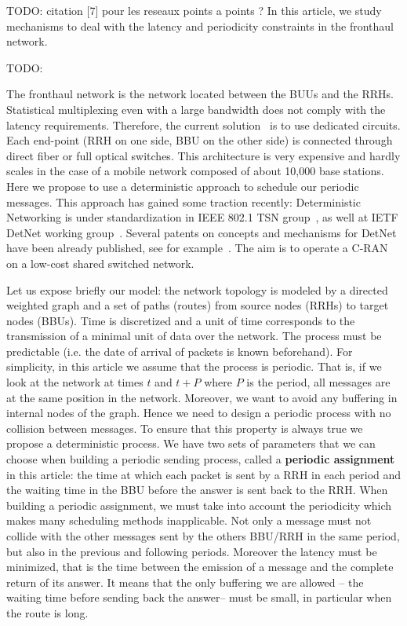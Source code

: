 \documentclass[a4paper,10pt]{article}
\newcommand{\todo}[1]{{\color{red} TODO: {#1}}}
\begin{document}
\todo{citation [7] pour les reseaux points a points ?}
 In this article, we study mechanisms to deal with the latency and periodicity constraints in the fronthaul network. \todo{The fronthaul network is the network located between the BUUs and the RRHs.
 Statistical multiplexing even with a large bandwidth does not comply with the latency requirements. Therefore, the current solution~\cite{pizzinat2015things,tayq2017real} is to use dedicated circuits. Each end-point (RRH on one side, BBU on the other side) is connected through direct fiber or full optical switches. This architecture is very expensive and hardly scales in the case of a mobile network composed of about 10,000 base stations. Here we propose to use a deterministic approach to schedule our periodic messages. This approach has gained some traction recently: Deterministic Networking is under standardization in IEEE 802.1 TSN group~\cite{finn-detnet-architecture-08}, as well at IETF DetNet working group~\cite{ieee802}. Several patents on concepts and mechanisms for DetNet have been already published, see for example~\cite{howe2005time,leclerc2016transmission}. The aim is to operate a C-RAN on a low-cost shared switched network.
 
Let us expose briefly our model: the network topology is modeled by a directed weighted graph and a set of paths (routes) from source nodes (RRHs) to target nodes (BBUs). Time is discretized and a unit of time corresponds to the transmission of a minimal unit of data over the network. The process must be  predictable (i.e. the date of arrival of packets is known beforehand). For simplicity, in this article we assume that the process is periodic. That is, if we look at the network at times $t$ and $t+P$ where $P$ is the period, all messages are at the same position in the network. Moreover, we want to avoid any  buffering in internal nodes of the graph. Hence we need to design a periodic process with no collision between messages. To ensure that this property is always true we propose a deterministic process.  We have two sets of parameters that we can choose when building a periodic sending process, called a \textbf{periodic assignment} in this article: the time at which each packet is sent by a RRH in each period and the waiting time in the BBU before the answer is sent back to the RRH. When building a periodic assignment, we must take into account the periodicity which makes many scheduling methods inapplicable. Not only a message must not collide with the other messages sent by the others BBU/RRH in the same period, but also in the previous and following periods. Moreover the latency must be minimized, that is the time 
 between the emission of a message and the complete return of its answer. It means that the only buffering we are allowed -- the waiting time before sending back the answer-- must be small, in particular when the route is long.
   
}
\end{document}

